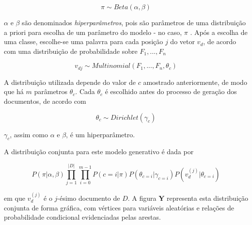\begin{equation}
\label{eq4:pi-naive}
\ensuremath{\pi \sim Beta(\alpha, \beta)}
\end{equation}

\ensuremath{\alpha} e \ensuremath{\beta} são denominados \emph{hiperparâmetros}, pois são parâmetros de uma distribuição a priori para escolha de um parâmetro do modelo - no caso, \ensuremath{\pi} \cite{gibbs}. Após a escolha de uma classe, escolhe-se uma palavra para cada posição \ensuremath{j} do vetor \ensuremath{v_d}, de acordo com uma distribuição de probabilidade sobre \ensuremath{F_1, ..., F_n}

\begin{equation}
\label{eq5:multi-naive}
\ensuremath{v_{dj} \sim Multinomial(F_1, ..., F_n, \theta_c)}
\end{equation}

A distribuição utilizada depende do valor de \ensuremath{c} amostrado anteriormente, de modo que há \ensuremath{m} parâmetros \ensuremath{\theta_c}. Cada \ensuremath{\theta_c} é escolhido antes do processo de geração dos documentos, de acordo com

\begin{equation}
\label{eq6:theta-naive}
\ensuremath{\theta_c \sim Dirichlet(\gamma_c)}
\end{equation}

\ensuremath{\gamma_c}, assim como \ensuremath{\alpha} e \ensuremath{\beta}, é um hiperparâmetro.

A distribuição conjunta para este modelo generativo é dada por

\begin{equation}
\label{eq7:joint-naive}
\ensuremath{P(\pi | \alpha, \beta)\prod_{j = 1}^{|D|}\prod_{i = 0}^{m - 1}P(c = i | \pi)P(\theta_{c = i} | \gamma_{c = i})P(v_d^{(j)} | \theta_{ c = i})} 
\end{equation}

em que \ensuremath{v_d^{(j)}} é o \ensuremath{j}-ésimo documento de \ensuremath{D}. A figura \textbf{Y} representa esta distribuição conjunta de forma gráfica, com vértices para variáveis aleatórias e relações de probabilidade condicional evidenciadas pelas arestas.



